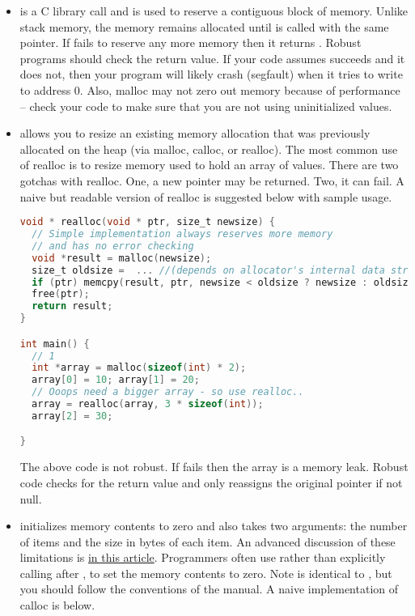 \begin{itemize}
\item {} is a C library call and is used to reserve a contiguous block of memory.
Unlike stack memory, the memory remains allocated until  is called with the same pointer.
If  fails to reserve any more memory then it returns .
Robust programs should check the return value.
If your code assumes  succeeds and it does not, then your program will likely crash (segfault) when it tries to write to address 0.
Also, malloc may not zero out memory because of performance -- check your code to make sure that you are not using uninitialized values.

\item {} allows you to resize an existing memory allocation that was previously allocated on the heap (via malloc, calloc, or realloc).
The most common use of realloc is to resize memory used to hold an array of values.
There are two gotchas with realloc.
One, a new pointer may be returned.
Two, it can fail.
A naive but readable version of realloc is suggested below with sample usage.

\begin{lstlisting}[language=C]
void * realloc(void * ptr, size_t newsize) {
  // Simple implementation always reserves more memory
  // and has no error checking
  void *result = malloc(newsize);
  size_t oldsize =  ... //(depends on allocator's internal data structure)
  if (ptr) memcpy(result, ptr, newsize < oldsize ? newsize : oldsize);
  free(ptr);
  return result;
}

int main() {
  // 1
  int *array = malloc(sizeof(int) * 2);
  array[0] = 10; array[1] = 20;
  // Ooops need a bigger array - so use realloc..
  array = realloc(array, 3 * sizeof(int));
  array[2] = 30;

}
\end{lstlisting}

The above code is not robust. If  fails then the array is a memory leak.
Robust code checks for the return value and only reassigns the original pointer if not null.

\item {} initializes memory contents to zero and also takes two arguments: the number of items and the size in bytes of each item.
An advanced discussion of these limitations is \href{http://locklessinc.com/articles/calloc/}{in this article}.
Programmers often use  rather than explicitly calling  after , to set the memory contents to zero.
Note  is identical to , but you should follow the conventions of the manual.
A naive implementation of calloc is below.


\end{itemize}
